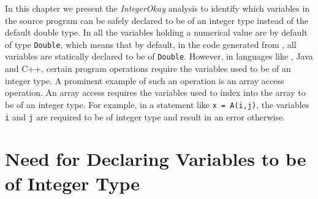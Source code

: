 %

In this chapter we present the \emph{IntegerOkay} analysis to identify
which variables in the source \matlab program can be safely declared to
be of an integer type instead of the default double type. In \matlab all
the variables holding a numerical value are by default of type
\texttt{Double}, which means that by default, in the \xten code
generated from \matlab, all variables are statically declared to be of
\texttt{Double}. However, in languages like \xten, Java and C++, certain
program operations require the variables used to be of an integer type.
A prominent example of such an operation is an array access operation.
An array access requires the variables used to index into the array to
be of an integer type. For example, in a statement like \texttt{x =
A(i,j)}, the variables \texttt{i} and \texttt{j} are required to be of
integer type and result in an error otherwise.

\section{Need for Declaring Variables to be of Integer Type}

